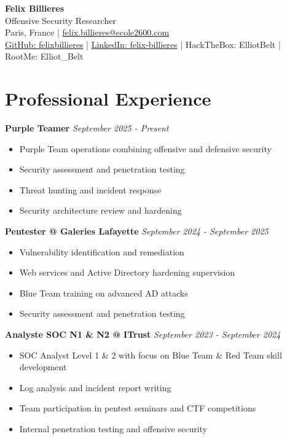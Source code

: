 \documentclass[10pt,a4paper]{article}
\begin{document}
\begin{center}
    {\Huge \textbf{Felix Billieres}} \\
    \vspace{3pt}
    {\Large Offensive Security Researcher} \\
    \vspace{5pt}
    Paris, France | \href{mailto:felix.billieres@ecole2600.com}{felix.billieres@ecole2600.com} \\
    \href{https://github.com/felixbillieres}{GitHub: felixbillieres} | \href{https://linkedin.com/in/felix-billieres}{LinkedIn: felix-billieres} | HackTheBox: ElliotBelt | RootMe: Elliot\_Belt
\end{center}

\vspace{8pt}

\section{Professional Experience}

\textbf{Purple Teamer} \hfill \textit{September 2025 - Present}
\begin{itemize}
\item Purple Team operations combining offensive and defensive security
\item Security assessment and penetration testing
\item Threat hunting and incident response
\item Security architecture review and hardening
\end{itemize}

\textbf{Pentester @ Galeries Lafayette} \hfill \textit{September 2024 - September 2025}
\begin{itemize}
\item Vulnerability identification and remediation
\item Web services and Active Directory hardening supervision
\item Blue Team training on advanced AD attacks
\item Security assessment and penetration testing
\end{itemize}

\textbf{Analyste SOC N1 \& N2 @ ITrust} \hfill \textit{September 2023 - September 2024}
\begin{itemize}
\item SOC Analyst Level 1 \& 2 with focus on Blue Team \& Red Team skill development
\item Log analysis and incident report writing
\item Team participation in pentest seminars and CTF competitions
\item Internal penetration testing and offensive security
\end{itemize}
\end{document}
